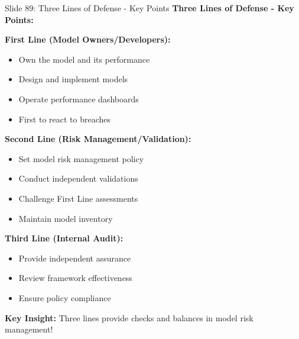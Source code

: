 \documentclass[8pt]{beamer}
\begin{document}
	\begin{frame}{Slide 89: Three Lines of Defense - Key Points}
		\fontsize{6.5}{7.5}\selectfont
		\textbf{Three Lines of Defense - Key Points:}
		
		\vspace{0.1cm}
		\textbf{First Line (Model Owners/Developers):}
		\begin{itemize}
			\item Own the model and its performance
			\item Design and implement models
			\item Operate performance dashboards
			\item First to react to breaches
		\end{itemize}
		
		\vspace{0.1cm}
		\textbf{Second Line (Risk Management/Validation):}
		\begin{itemize}
			\item Set model risk management policy
			\item Conduct independent validations
			\item Challenge First Line assessments
			\item Maintain model inventory
		\end{itemize}
		
		\vspace{0.1cm}
		\textbf{Third Line (Internal Audit):}
		\begin{itemize}
			\item Provide independent assurance
			\item Review framework effectiveness
			\item Ensure policy compliance
		\end{itemize}
		
		\textcolor{myblue}{\textbf{Key Insight:}} Three lines provide \textcolor{myblue}{checks and balances in model risk management}!
	\end{frame}
	
\end{document}
